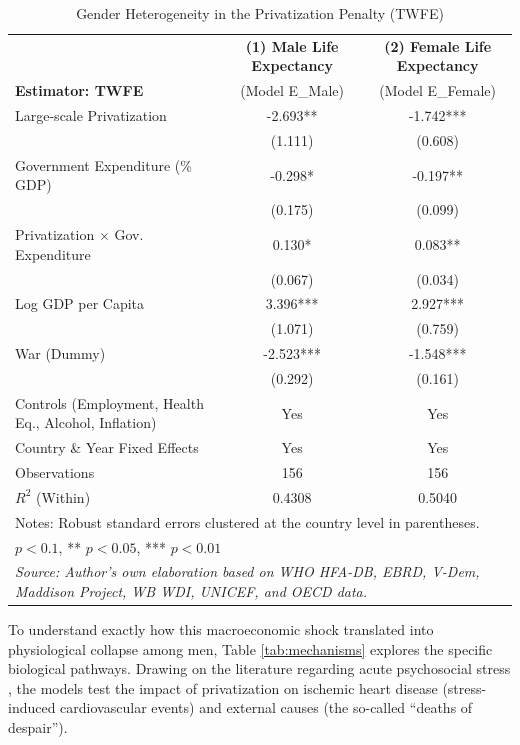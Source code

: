 \documentclass[12pt]{article}
\begin{document}
\begin{table}[H]
\centering
\caption{Gender Heterogeneity in the Privatization Penalty (TWFE)}
\label{tab:gender_twfe}
\footnotesize
\begin{tabular}{l c c}
\toprule
 & \textbf{(1) Male Life Expectancy} & \textbf{(2) Female Life Expectancy} \\
\textbf{Estimator: TWFE} & (Model E\_Male) & (Model E\_Female) \\
\midrule
Large-scale Privatization & -2.693** & -1.742*** \\
 & (1.111) & (0.608) \\
Government Expenditure (\% GDP) & -0.298* & -0.197** \\
 & (0.175) & (0.099) \\
Privatization $\times$ Gov. Expenditure & 0.130* & 0.083** \\
 & (0.067) & (0.034) \\
Log GDP per Capita & 3.396*** & 2.927*** \\
 & (1.071) & (0.759) \\
War (Dummy) & -2.523*** & -1.548*** \\
 & (0.292) & (0.161) \\
\midrule
Controls (Employment, Health Eq., Alcohol, Inflation) & Yes & Yes \\
Country \& Year Fixed Effects & Yes & Yes \\
Observations & 156 & 156 \\
$R^2$ (Within) & 0.4308 & 0.5040 \\
\bottomrule
\multicolumn{3}{l}{\scriptsize Notes: Robust standard errors clustered at the country level in parentheses.} \\
\multicolumn{3}{l}{\scriptsize * $p < 0.1$, ** $p < 0.05$, *** $p < 0.01$} \\
\multicolumn{3}{l}{\scriptsize \textit{Source: Author's own elaboration based on WHO HFA-DB, EBRD, V-Dem, Maddison Project, WB WDI, UNICEF, and OECD data.}} \\
\end{tabular}
\end{table}

To understand exactly how this macroeconomic shock translated into physiological collapse among men, Table \ref{tab:mechanisms} explores the specific biological pathways. Drawing on the literature 
regarding acute psychosocial stress \citep{Leon1998}, the models test the impact of privatization on ischemic heart disease (stress-induced cardiovascular events) and external causes (the so-called ``deaths 
of despair''). 
\end{document}
